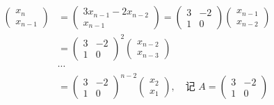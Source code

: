 		 \begin{align*}
			 \begin{pmatrix}
				 x_{n} \\
				 x_{n-1}
			 \end{pmatrix} & = \begin{pmatrix}
				                   3x_{n-1} - 2x_{n-2} \\
				                   x_{n-1}
			                   \end{pmatrix} = \begin{pmatrix}
				                                   3 & -2 \\
				                                   1 & 0
			                                   \end{pmatrix} \begin{pmatrix}
				                                                 x_{n-1} \\
				                                                 x_{n-2}
			                                                 \end{pmatrix}                            \\
			                 & = \begin{pmatrix}
				                     3 & -2 \\
				                     1 & 0
			                     \end{pmatrix}^{2} \begin{pmatrix}
				                                       x_{n-2} \\
				                                       x_{n-3}
			                                       \end{pmatrix}                                      \\
			                 & \cdots                                                                  \\
			                 & = \begin{pmatrix}
				                     3 & -2 \\
				                     1 & 0
			                     \end{pmatrix}^{n-2} \begin{pmatrix}
				                                         x_{2} \\
				                                         x_{1}
			                                         \end{pmatrix}, \quad \text{记 } A = \begin{pmatrix}
				                                                                            3 & -2 \\
				                                                                            1 & 0
			                                                                            \end{pmatrix}
		 \end{align*}

